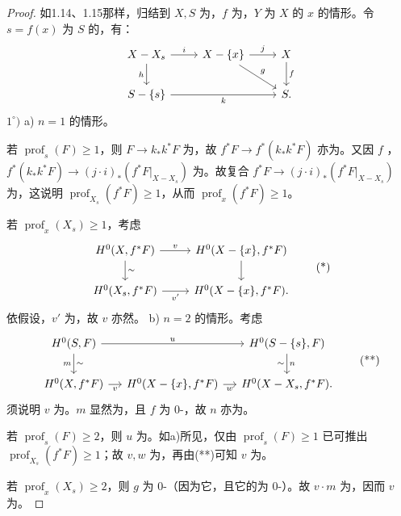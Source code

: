 \begin{proof}
如1.14、1.15那样，归结到 $X,S$ 为，$f$ 为，$Y$ 为 $X$ 的 $x$ 的情形。令 $s=f(x)$ 为 $S$ 的，有：
\[\begin{tikzcd}
X-X_s\arrow[r,"i"]\arrow[d,"h"']&X-\{x\}\arrow[r,"j"]\arrow[dr,"g"]&X\arrow[d,"f"]\\
S-\{s\}\arrow[rr,"k"']&&S.
\end{tikzcd}\]
$1^\circ)$ a) $n=1$ 的情形。

若 $\operatorname{prof}_s(F)\geq1$，则 $F\to k_*k^*F$ 为，故 $f^*F\to f^*(k_*k^*F)$ 亦为。又因 $f$ ， $f^*(k_*k^*F)\to(j\cdot i)_*(f^*F|_{X-X_s})$ 为。故复合 $f^*F\to(j\cdot i)_*(f^*F|_{X-X_s})$ 为，这说明 $\operatorname{prof}_{X_s}(f^*F)\geq1$，从而 $\operatorname{prof}_x(f^*F)\geq1$。

若 $\operatorname{prof}_x(X_s)\geq1$，考虑
\[\begin{tikzcd}
H^0(X,f^*F)\arrow[r,"v"]\arrow[d,"\sim"]&H^0(X-\{x\},f^*F)\arrow[d]\\
H^0(X_s,f^*F)\arrow[r,"v'"']&H^0(X-\{x\},f^*F).
\end{tikzcd}\tag{*}\]
依假设，$v'$ 为，故 $v$ 亦然。
b) $n=2$ 的情形。考虑
\[\begin{tikzcd}[column sep=small]
H^0(S,F)\arrow[rr,"u"]\arrow[d,"m"',"\sim"]&&H^0(S-\{s\},F)\arrow[d,"n","\sim"']\\
H^0(X,f^*F)\arrow[r,"v"']&H^0(X-\{x\},f^*F)\arrow[r,"w"']&H^0(X-X_s,f^*F).
\end{tikzcd}\tag{**}\]
须说明 $v$ 为。$m$ 显然为，且 $f$ 为 $0$-，故 $n$ 亦为。

若 $\operatorname{prof}_s(F)\geq2$，则 $u$ 为。如a)所见，仅由 $\operatorname{prof}_s(F)\geq1$ 已可推出 $\operatorname{prof}_{X_s}(f^*F)\geq1$；故 $v,w$ 为，再由(**)可知 $v$ 为。

若 $\operatorname{prof}_x(X_s)\geq2$，则 $g$ 为 $0$-（因为它，且它的为 $0$-）。故 $v\cdot m$ 为，因而 $v$ 为。


\end{proof}
